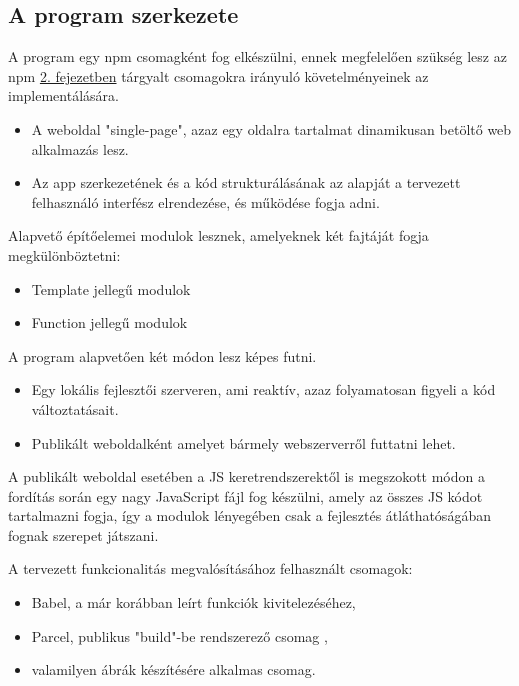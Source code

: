 \subsection{A program szerkezete}

A program egy npm csomagként fog elkészülni, ennek megfelelően szükség lesz az npm \hyperlink{section2.2}{2. fejezetben} tárgyalt csomagokra irányuló követelményeinek az implementálására.\\

\begin{itemize}
	\item A weboldal "single-page", azaz egy oldalra tartalmat dinamikusan betöltő web alkalmazás lesz.
	\item Az app szerkezetének és a kód strukturálásának az alapját a tervezett felhasználó interfész elrendezése, és működése fogja adni.
\end{itemize}

\noindent Alapvető építőelemei modulok lesznek, amelyeknek két fajtáját fogja megkülönböztetni:

\begin{itemize}
	\item Template jellegű modulok
	\item Function jellegű modulok
\end{itemize}

\noindent A program alapvetően két módon lesz képes futni.

\begin{itemize}
	\item Egy lokális fejlesztői szerveren, ami reaktív, azaz folyamatosan figyeli a kód változtatásait.
	\item Publikált weboldalként amelyet bármely webszerverről futtatni lehet.
\end{itemize}

\noindent A publikált weboldal esetében a JS keretrendszerektől is megszokott módon a fordítás során egy nagy JavaScript fájl fog készülni, amely az összes JS kódot tartalmazni fogja, így a modulok lényegében csak a fejlesztés átláthatóságában fognak szerepet játszani.

\noindent A tervezett funkcionalitás megvalósításához felhasznált csomagok:
\begin{itemize}
	\item Babel, a már korábban leírt funkciók kivitelezéséhez,
	\item Parcel, publikus "build"-be rendszerező csomag \cite{parcel},
	\item valamilyen ábrák készítésére alkalmas csomag.
\end{itemize}

